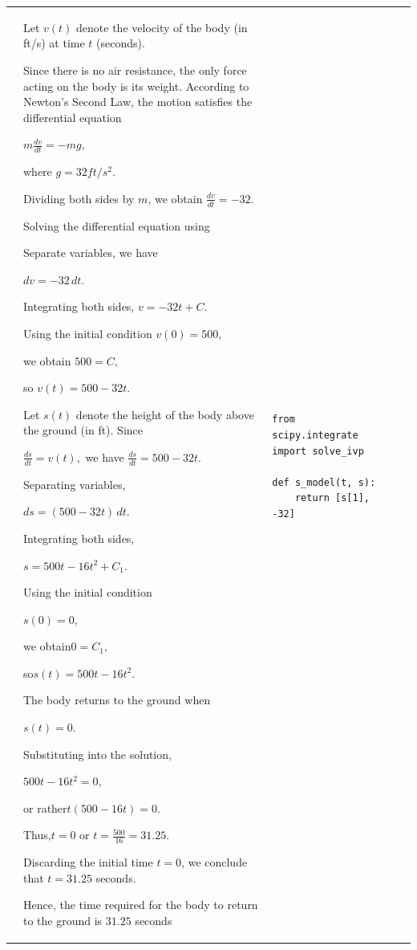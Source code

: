 \documentclass[a4paper,12pt]{article}
\begin{document}
\begin{longtable}{|p{0.3cm}|p{}|p{10cm}|p{}|p{1.5cm}|}
              & Let $v(t)$ denote the velocity of the body (in ft/s) at time $t$ (seconds).

Since there is no air resistance, the only force acting on the body is its weight. According to Newton's Second Law, the motion satisfies the differential equation

$m\frac{dv}{dt}=-mg,$

where $g=32 ft/s^2$.

Dividing both sides by $m$, we obtain $\frac{dv}{dt}=-32.$

Solving the differential equation using

Separate variables, we have

$dv=-32\,dt.$

Integrating both sides, $v=-32t+C.$

Using the initial condition $v(0)=500,$

we obtain $500=C,$

so $v(t)=500-32t.$

Let $s(t)$ denote the height of the body above the ground (in ft). Since

$\frac{ds}{dt}=v(t),$ we have $\frac{ds}{dt}=500-32t.$

Separating variables,

$ds=(500-32t)\,dt.$

Integrating both sides,

$s=500t-16t^2+C_1.$

Using the initial condition

$s(0)=0,$

we obtain$0=C_1,$

so$s(t)=500t-16t^2.$

The body returns to the ground when

$s(t)=0.$

Substituting into the solution,

$500t-16t^2=0,$

or rather$t(500-16t)=0.$

Thus,$t=0$ or $t=\frac{500}{16}=31.25.$

Discarding the initial time $t=0$, we conclude that $t=31.25$ seconds.

Hence, the time required for the body to return to the ground is
$31.25$ seconds

 &\begin{verbatim}
from scipy.integrate import solve_ivp

def s_model(t, s):
    return [s[1], -32]


\end{verbatim}
\end{longtable}
\end{document}
